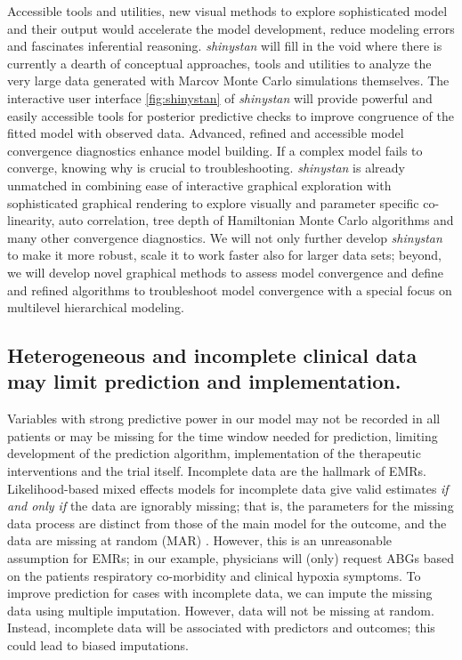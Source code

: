 \documentclass[11pt,notitlepage]{article}
\begin{document}
Accessible tools and utilities, new visual methods to explore sophisticated model and their output would accelerate the model development, reduce modeling errors and fascinates inferential reasoning. \textit{shinystan} will fill in the void where there is currently a dearth of conceptual approaches, tools and utilities to analyze the very large data generated with Marcov Monte Carlo simulations themselves. The interactive user interface \ref{fig:shinystan} of \textit{shinystan} will provide powerful and easily accessible tools for posterior predictive checks to improve congruence of the fitted model with observed data. Advanced, refined and accessible model convergence diagnostics enhance model building. If a complex model fails to converge, knowing why is crucial to troubleshooting. \textit{shinystan} is already unmatched in combining ease of interactive graphical exploration with sophisticated graphical rendering to explore visually and parameter specific co-linearity, auto correlation, tree depth of Hamiltonian Monte Carlo algorithms and many other convergence diagnostics. We will not only further develop \textit{shinystan} to make it more robust, scale it to work faster also for larger data sets; beyond, we will develop novel graphical methods to assess model convergence and define and refined algorithms to troubleshoot model convergence with a special focus on multilevel hierarchical modeling. 

 

\subsection*{Heterogeneous and incomplete clinical data may limit prediction and implementation.}
Variables with strong predictive power in our model may not be recorded in all patients or may be missing for the time window needed for prediction, limiting development of the prediction algorithm, implementation of the therapeutic interventions and the trial itself. Incomplete data are the hallmark of EMRs. Likelihood-based mixed effects models for incomplete data give valid estimates \textit{if and only if } the data are ignorably missing; that is, the parameters for the missing data process are distinct from those of the main model for the outcome, and the data are missing at random (MAR) \cite{Rubin1976}. However, this is an unreasonable assumption for EMRs; in our example, physicians will (only) request ABGs based on the patients respiratory co-morbidity and clinical hypoxia symptoms. To improve prediction for cases with incomplete data, we can impute the missing data using multiple imputation. However, data will not be missing at random. Instead, incomplete data will be associated with predictors and outcomes; this could lead to biased imputations.
\end{document}
